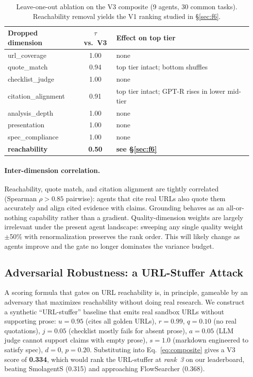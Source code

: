 \documentclass{article}
\begin{document}
\begin{table}[t]
\centering
\caption{Leave-one-out ablation on the V3 composite (9 agents, 30 common tasks). Reachability removal yields the V1 ranking studied in \S\ref{sec:f6}.}
\label{tab:ablation}
\vspace{1mm}
\small
\begin{tabular}{@{}lcl@{}}
\toprule
\textbf{Dropped dimension} & \textbf{$\tau$ vs.\ V3} & \textbf{Effect on top tier} \\
\midrule
url\_coverage      & 1.00 & none \\
quote\_match       & 0.94 & top tier intact; bottom shuffles \\
checklist\_judge   & 1.00 & none \\
citation\_alignment & 0.91 & top tier intact; GPT-R rises in lower mid-tier \\
analysis\_depth    & 1.00 & none \\
presentation       & 1.00 & none \\
spec\_compliance   & 1.00 & none \\
\textbf{reachability} & \textbf{0.50} & \textbf{see \S\ref{sec:f6}} \\
\bottomrule
\end{tabular}
\end{table}

\paragraph{Inter-dimension correlation.} Reachability, quote match, and citation alignment are tightly correlated (Spearman $\rho > 0.85$ pairwise): agents that cite real URLs also quote them accurately and align cited evidence with claims. Grounding behaves as an all-or-nothing capability rather than a gradient. Quality-dimension weights are largely irrelevant under the present agent landscape: sweeping any single quality weight $\pm$50\% with renormalization preserves the rank order. This will likely change as agents improve and the gate no longer dominates the variance budget.

\subsection{Adversarial Robustness: a URL-Stuffer Attack}
\label{sec:adversarial}

A scoring formula that gates on URL reachability is, in principle, gameable by an adversary that maximizes reachability without doing real research. We construct a synthetic ``URL-stuffer'' baseline that emits real sandbox URLs without supporting prose: $u{=}0.95$ (cites all golden URLs), $r{=}0.99$, $q{=}0.10$ (no real quotations), $j{=}0.05$ (checklist mostly fails for absent prose), $a{=}0.05$ (LLM judge cannot support claims with empty prose), $s{=}1.0$ (markdown engineered to satisfy spec), $d{=}0$, $p{=}0.20$. Substituting into Eq.~\eqref{eq:composite} gives a V3 score of \textbf{0.334}, which would rank the URL-stuffer at \emph{rank~3} on our leaderboard, beating SmolagentS (0.315) and approaching FlowSearcher (0.368).
\end{document}
